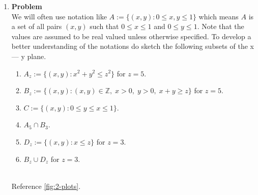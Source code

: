 \documentclass[12pt]{article}
\newenvironment{Ex}{\textbf{Problem}\vspace{.75em}\\}{}
\begin{document}
\begin{enumerate}
\begin{Ex}
\begin{solution}
\begin{enumerate}
      \item This assumes that the sum of both power subcells $a,b$
        fall within the range $(5,6)$. Reference \cref{fig:power-fig}
        for a graphical representation. The event is the shaded region
        between the two curves, calculated to be $3.5/25$, or $0.14$.
        \begin{figure}[hbt]
          \centering
          
          \caption{A graphical representation of the event requirements}
          \label{fig:power-fig}
        \end{figure}
      \end{enumerate}
    \end{solution}
  \end{Ex}
\item 
  \begin{Ex}
    We will often use notation like $A:=\{(x,y) : 0 \le x, y\le 1\}$
    which means $A$ is a set of all pairs $(x,y)$ such that $0\le x\le
    1$ and $0 \le y \le 1$. Note that the values are assumed to be
    real valued unless otherwise specified. To develop a better
    understanding of the notations do sketch the following subsets of
    the x --- y plane.
    \begin{enumerate}
    \item $A_z := \{(x,y) : x^2+y^2 \le z^2\}$ for $z=5$.
    \item $B_z := \{(x,y) : (x,y) \in \mathbb{Z},\; x>0,\; y>0,\; x+y\ge z\}$ for $z=5$.
    \item $C := \{(x,y) : 0 \le y \le x \le 1\}$.
    \item $A_5 \cap B_3$.
    \item $D_z :=\{(x,y) : x \le z\}$ for $z=3$.
    \item $B_z \cup D_z$ for $z=3$.
    \end{enumerate}
    \begin{solution} \hfill\\\vspace{1.5em}
      Reference \cref{fig:2-plots}.
      \begin{figure}[hbt]
        \centering
        \begin{subfigure}[b]{0.45\textwidth}
          \resizebox{\textwidth}{!}{}
        \end{subfigure}
        \begin{subfigure}[b]{0.45\textwidth}
          \resizebox{\textwidth}{!}{}
        \end{subfigure}
        \begin{subfigure}[b]{0.45\textwidth}

\end{subfigure}
\end{figure}
\end{solution}
\end{Ex}
\end{enumerate}
\end{document}
